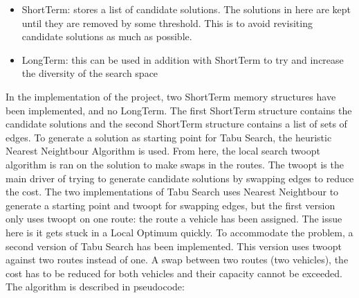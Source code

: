 \documentclass[12pt]{article}
\begin{document}
\begin{itemize}
	\item Short\-Term: stores a list of candidate solutions. The solutions in here are kept until they are removed by some threshold. This is to avoid revisiting candidate solutions \- as much as possible. 
	\item Long\-Term: this can be used in addition with Short\-Term to try and increase the diversity of the search space
\end{itemize}

In the implementation of the project, two Short\-Term memory structures have been implemented, and no Long\-Term. The first Short\-Term structure contains the candidate solutions and the second Short\-Term structure contains a list of sets of edges. To generate a solution as starting point for Tabu Search, the heuristic Nearest Neightbour Algorithm \cite{srivastava_srivastava_2018:1} is used. From here, the local search two\-opt algorithm \cite{venhuis_2019:1} is ran on the solution to make swaps in the routes. The two\-opt is the main driver of trying to generate candidate solutions by swapping edges to reduce the cost.
\newline
The two implementations of Tabu Search uses Nearest Neightbour to generate a starting point and two\-opt for swapping edges, but the first version only uses two\-opt on one route: the route a vehicle has been assigned. The issue here is it gets stuck in a Local Optimum quickly. 
To accommodate the problem, a second version of Tabu Search has been implemented. This version uses two\-opt against two routes instead of one. A swap between two routes (two vehicles), the cost has to be reduced for both vehicles and their capacity cannot be exceeded. 
\newline
The algorithm is described in pseudocode:
\newline
\end{document}
